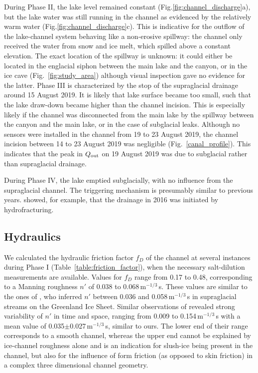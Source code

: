 During Phase II, the lake level remained constant (Fig.\ref{fig:channel_discharge}a), but the lake water was still running in the channel as evidenced by the relatively warm water (Fig.\ref{fig:channel_discharge}c). This is indicative for the outflow of the lake-channel system behaving like a non-erosive spillway: the channel only received the water from snow and ice melt, which spilled above a constant elevation. The  exact location of the spillway is unknown: it could either be located in the englacial siphon between the main lake and the canyon, or in the ice cave (Fig.~\ref{fig:study_area}) although visual inspection gave no evidence for the latter.
Phase III is characterized by the stop of the supraglacial drainage around 15 August 2019. It is likely that lake surface became too small, such that the lake draw-down became higher than the channel incision. This is especially likely if the channel was disconnected from the main lake by the spillway between the canyon and the main lake, or in the case of subglacial leaks. Although no sensors were installed in the channel from 19 to 23 August 2019, the channel incision between 14 to 23 August 2019 was negligible (Fig.~\ref{canal_profile}). This indicates that the peak in $Q_{\rm out}$ on 19 August 2019 was due to subglacial rather than supraglacial drainage.

During Phase IV, the lake emptied subglacially, with no influence from the supraglacial channel. The triggering mechanism is presumably similar to previous years. \cite{Lindner&al2020} showed, for example, that the drainage in 2016 was initiated by hydrofracturing.

\subsection{Hydraulics}

We calculated the hydraulic friction factor $f_D$ of the channel at several instances during Phase I (Table~\ref{table:friction_factor}), when the necessary salt-dilution measurements are available. Values for $f_D$ range from 0.17 to 0.48, corresponding to a Manning roughness $n'$ of 0.038 to 0.068\,m$^{-1/3}$\,s. These values are similar to the ones of \cite{Mernild&al2006}, who inferred $n'$ between 0.036 and 0.058\,m$^{-1/3}$\,s in supraglacial streams on the Greenland Ice Sheet. Similar observations of \cite{Gleason&al2016} revealed strong variability of $n'$ in time and space, ranging from 0.009 to 0.154\,m$^{-1/3}$\,s with a mean value of 0.035$\pm$0.027\,m$^{-1/3}$\,s, similar to ours. The lower end of their range corresponds to a smooth channel, whereas the upper end cannot be explained by ice-channel roughness alone and is an indication for slush-ice being present in the channel, but also for the influence of form friction (as opposed to skin friction) in a complex three dimensional channel geometry.

